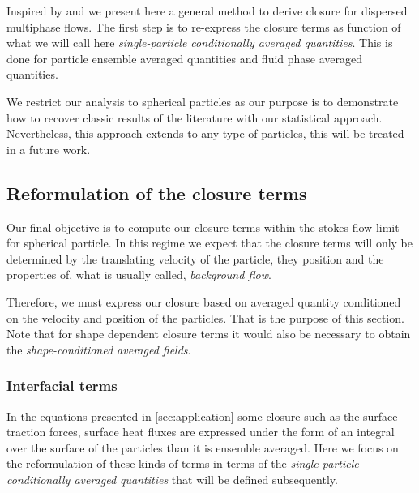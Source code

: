 
Inspired by \cite{hinch1977averaged} and \cite{zhang1994ensemble} we present here a general method to derive closure for dispersed multiphase flows. 
The first step is to re-express the closure terms as function of what we will call here \textit{single-particle conditionally averaged quantities}. 
This is done for particle ensemble averaged quantities and fluid phase averaged quantities. 

We restrict our analysis to spherical particles as our purpose is to demonstrate how to recover classic results of the literature with our statistical approach. 
Nevertheless, this approach extends to any type of particles, this will be treated in a future work. 

\subsection{Reformulation of the closure terms}

Our final objective is to compute our closure terms within the stokes flow limit for spherical particle.
In this regime we expect that  the closure terms will only be determined by the translating velocity of the particle, they position and the properties of, what is usually called, \textit{background flow}. 


Therefore, we must express our closure based on averaged quantity conditioned on the velocity and position of the particles. 
That is the purpose of this section. 
Note that for shape dependent closure terms it would also be necessary to obtain the \textit{shape-conditioned averaged fields}. 

\subsubsection{Interfacial terms}

In the equations presented in \ref{sec:application} some closure such as the surface traction forces, surface heat fluxes are expressed under the form of an integral over the surface of the particles than it is ensemble averaged. 
Here we focus on the reformulation of these kinds of terms in terms of the \textit{single-particle conditionally averaged quantities} that will be defined subsequently.

